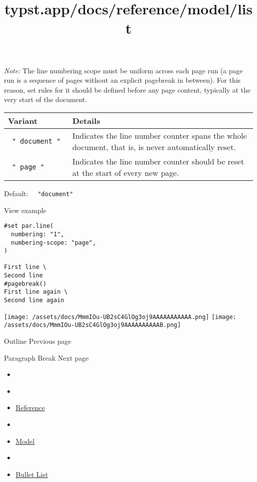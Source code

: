 \emph{Note:} The line numbering scope must be uniform across each page
run (a page run is a sequence of pages without an explicit pagebreak in
between). For this reason, set rules for it should be defined before any
page content, typically at the very start of the document.

\begin{longtable}[]{@{}ll@{}}
\toprule\noalign{}
Variant & Details \\
\midrule\noalign{}
\endhead
\bottomrule\noalign{}
\endlastfoot
\texttt{\ "\ document\ "\ } & Indicates the line number counter spans
the whole document, that is, is never automatically reset. \\
\texttt{\ "\ page\ "\ } & Indicates the line number counter should be
reset at the start of every new page. \\
\end{longtable}

Default: \texttt{\ }{\texttt{\ "document"\ }}\texttt{\ }


View example

\begin{verbatim}
#set par.line(
  numbering: "1",
  numbering-scope: "page",
)

First line \
Second line
#pagebreak()
First line again \
Second line again
\end{verbatim}

\texttt{[image: /assets/docs/MmmIOu-UB2sC4GlOg3oj9AAAAAAAAAAA.png]}
\texttt{[image: /assets/docs/MmmIOu-UB2sC4GlOg3oj9AAAAAAAAAAB.png]}

\href{/docs/reference/model/outline/}{\pandocbounded{}}

{ Outline } { Previous page }

\href{/docs/reference/model/parbreak/}{\pandocbounded{}}

{ Paragraph Break } { Next page }


\title{typst.app/docs/reference/model/list}

\begin{itemize}
\tightlist
\item
  \href{/docs}{}
\item
  
\item
  \href{/docs/reference/}{Reference}
\item
  
\item
  \href{/docs/reference/model/}{Model}
\item
  
\item
  \href{/docs/reference/model/list/}{Bullet List}
\end{itemize}

